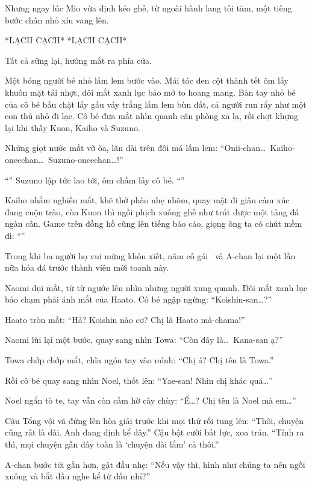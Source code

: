 \documentclass[../main.tex]{subfiles}
\begin{document}
Nhưng ngay lúc Mio vừa định kéo ghế, từ ngoài hành lang tối tăm, một tiếng bước chân nhỏ xíu vang lên.

*LẠCH CẠCH* *LẠCH CẠCH*

Tất cả sững lại, hướng mắt ra phía cửa.

Một bóng người bé nhỏ lấm lem bước vào. Mái tóc đen cột thành tết ôm lấy khuôn mặt tái nhợt, đôi mắt xanh lục bảo mở to hoang mang. Bàn tay nhỏ bé của cô bé bấu chặt lấy gấu váy trắng lấm lem bùn đất, cả người run rẩy như một con thú nhỏ đi lạc. Cô bé đưa mắt nhìn quanh căn phòng xa lạ, rồi chợt khựng lại khi thấy Kuon, Kaiho và Suzuno.

Những giọt nước mắt vỡ òa, lăn dài trên đôi má lấm lem: ``Onii-chan\dots\ Kaiho-oneechan\dots\ Suzuno-oneechan\dots!''

``'' Suzuno lập tức lao tới, ôm chầm lấy cô bé. ``''

Kaiho nhắm nghiền mắt, khẽ thở phào nhẹ nhõm, quay mặt đi giấu cảm xúc đang cuộn trào, còn Kuon thì ngồi phịch xuống ghế như trút được một tảng đá ngàn cân. Game trên đồng hồ cũng lên tiếng báo cáo, giọng ông ta có chút mềm đi: ``''

Trong khi ba người họ vui mừng khôn xiết, năm cô gái \hll\ và A-chan lại một lần nữa hóa đá trước thành viên mới toanh này.

Naomi dụi mắt, từ từ ngước lên nhìn những người xung quanh. Đôi mắt xanh lục bảo chạm phải ánh mắt của Haato. Cô bé ngập ngừng: ``Koishin-san\dots?''

Haato tròn mắt: ``Hả? Koishin nào cơ? Chị là Haato mà-chama!''

Naomi lùi lại một bước, quay sang nhìn Towa: ``Còn đây là\dots\ Kana-san ạ?''

Towa chớp chớp mắt, chĩa ngón tay vào mình: ``Chị á? Chị tên là Towa.''

Rồi cô bé quay sang nhìn Noel, thốt lên: ``Yae-san! Nhìn chị khác quá\dots''

Noel ngẩn tò te, tay vẫn còn cầm hờ cây chùy: ``Ể\dots? Chị tên là Noel mà em\dots''

Cậu Tổng vội vã đứng lên hòa giải trước khi mọi thứ rối tung lên: ``Thôi, chuyện cũng rất là dài. Anh đang định kể đây.'' Cậu bật cười bất lực, xoa trán. ``Tính ra thì, mọi chuyện gần đây toàn là `chuyện dài lắm' cả thôi.''

A-chan bước tới gần hơn, gật đầu nhẹ: ``Nếu vậy thì, hình như chúng ta nên ngồi xuống và bắt đầu nghe kể từ đầu nhỉ?''
\end{document}
